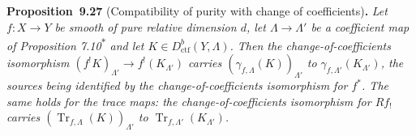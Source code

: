 \documentclass[11pt]{article}
\newenvironment{bpstatement}[2]{\par\addvspace{0.6\baselineskip}\noindent\textbf{#1}#2\textbf{.}\enspace\ignorespaces}
  {\par\addvspace{0.4\baselineskip}}
\newenvironment{bpstatementit}[2]{\begin{bpstatement}{#1}{#2}\itshape\ignorespaces}{\end{bpstatement}}
\newcommand{\bpout}[1]{#1\textsuperscript{\hyperlink{bp-outside}{\ensuremath{\ast}}}}
\begin{document}
\label{bp90}%
\begin{bpstatementit}{Proposition~9.27}{ (Compatibility of purity with change of coefficients)}
Let \(f:X\to Y\) be smooth of pure relative dimension \(d\), let \(\Lambda\to\Lambda'\) be a coefficient map of Proposition \bpout{7.10} and let \(K\in D^b_{\mathrm{ctf}}(Y,\Lambda)\). Then the change-of-coefficients isomorphism \((f^!K)_{\Lambda'}\to f^!(K_{\Lambda'})\) carries \((\gamma_{f,\Lambda}(K))_{\Lambda'}\) to \(\gamma_{f,\Lambda'}(K_{\Lambda'})\), the sources being identified by the change-of-coefficients isomorphism for \(f^*\). The same holds for the trace maps: the change-of-coefficients isomorphism for \(Rf_!\) carries \((\operatorname{Tr}_{f,\Lambda}(K))_{\Lambda'}\) to \(\operatorname{Tr}_{f,\Lambda'}(K_{\Lambda'})\).
\end{bpstatementit}
\end{document}

